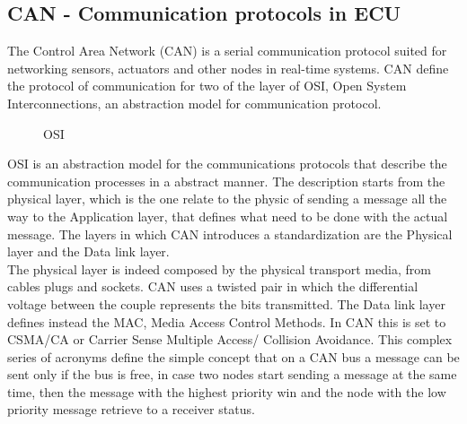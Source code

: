 \documentclass[../main.tex]{subfiles}
\begin{document}
\subsection{CAN - Communication protocols in ECU}
The Control Area Network (\gls{CAN}) is a serial communication protocol suited for networking sensors, actuators and other nodes in real-time systems. \gls{CAN} define the protocol of communication for two of the layer of \gls{OSI}, Open System Interconnections, an abstraction model for communication protocol. 
\begin{figure}[H]
    \centering
{}
    \caption{OSI}
    \label{fig:ECUstructure}
\end{figure}
\gls{OSI} is an abstraction model for the communications protocols that describe the communication processes in a abstract manner. The description starts from the physical layer, which is the one relate to the physic of sending a message all the way to the Application layer, that defines what need to be done with the actual message. The layers in which \gls{CAN} introduces a standardization are the Physical layer and the Data link layer.\\
The physical layer is indeed composed by the physical transport media, from cables plugs and sockets. \gls{CAN} uses a twisted pair in which the differential voltage between the couple represents the bits transmitted. The Data link layer defines instead the \gls{MAC}, Media Access Control Methods. In \gls{CAN} this is set to \gls{CSMA/CA} or Carrier Sense Multiple Access/ Collision Avoidance. This complex series of acronyms define the simple concept that on a \gls{CAN} \gls{bus} a message can be sent only if the \gls{bus} is free, in case two nodes start sending a message at the same time, then the message with the highest priority win and the node with the low priority message retrieve to a receiver status.
\end{document}
